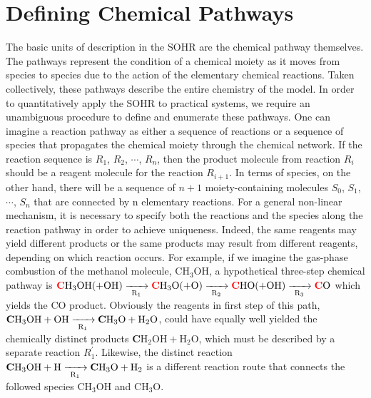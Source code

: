 \section{Defining Chemical Pathways}
\label{ch2:def_path}
The basic units of description in the SOHR are the chemical pathway themselves. The
pathways represent the condition of a chemical moiety as it moves from species to species
due to the action of the elementary chemical reactions. Taken collectively, these
pathways describe the entire chemistry of the model. In order to quantitatively apply
the SOHR to practical systems, we require an unambiguous procedure to define and
enumerate these pathways. One can imagine a reaction pathway as either a sequence of reactions or a sequence of species that propagates the chemical moiety through the
chemical network. If the reaction sequence is $R_1$, $R_2$, $\cdots$, $R_n$, then the product molecule
from reaction $R_i$ should be a reagent molecule for the reaction $R_{i+1}$. In terms of species,
on the other hand, there will be a sequence of $n + 1$ moiety-containing molecules $S_0$,
$S_1$, $\cdots$, $S_n$ that are connected by n elementary reactions. For a general non-linear mechanism,
it is necessary to specify both the reactions and the species along the reaction
pathway in order to achieve uniqueness. Indeed, the same reagents may yield different
products or the same products may result from different reagents, depending on which
reaction occurs. For example, if we imagine the gas-phase combustion of the methanol
molecule, CH$_3$OH, a hypothetical three-step chemical pathway is $\textcolor{red}{\textbf{C}}\text{H}_3\text{OH}(+\text{OH}) \xrightarrow[\text{R}_{1}]{\makebox[0.6cm]{}} \textcolor{red}{\textbf{C}}\text{H}_3\text{O} (+\text{O})  \xrightarrow[\text{R}_{2}]{\makebox[0.6cm]{}} \textcolor{red}{\textbf{C}}\text{HO} (+\text{OH}) \xrightarrow[\text{R}_{3}]{\makebox[0.6cm]{}} \textcolor{red}{\textbf{C}}\text{O}$ which yields the CO product. Obviously the reagents in first step of this path, ${\textbf{C}}\text{H}_3\text{OH}+\text{OH} \xrightarrow[\text{R}_{1}]{\makebox[0.6cm]{}} {\textbf{C}}\text{H}_3\text{O} + \text{H}_2\text{O}$, could have equally well yielded the chemically distinct products ${\textbf{C}}\text{H}_2\text{OH} + \text{H}_2\text{O}$, which must be described by a separate
reaction $R_1^{\prime}$. Likewise, the distinct reaction ${\textbf{C}}\text{H}_3\text{OH}+\text{H} \xrightarrow[\text{R}_{1}]{\makebox[0.6cm]{}} {\textbf{C}}\text{H}_3\text{O} + \text{H}_2$ is a different reaction route that connects the followed species CH$_3$OH and CH$_3$O.
\newline
